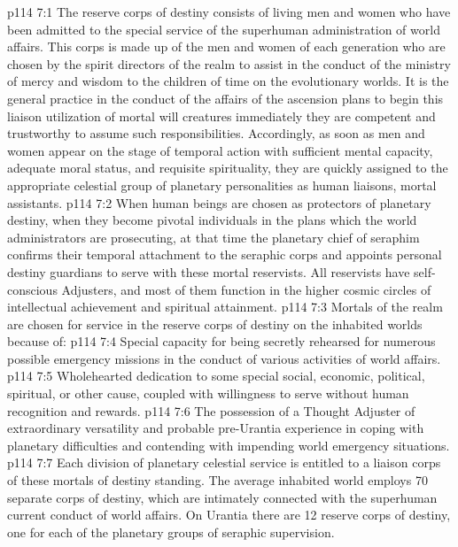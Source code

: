 \vs p114 7:1 The reserve corps of destiny consists of living men and women who have been admitted to the special service of the superhuman administration of world affairs. This corps is made up of the men and women of each generation who are chosen by the spirit directors of the realm to assist in the conduct of the ministry of mercy and wisdom to the children of time on the evolutionary worlds. It is the general practice in the conduct of the affairs of the ascension plans to begin this liaison utilization of mortal will creatures immediately they are competent and trustworthy to assume such responsibilities. Accordingly, as soon as men and women appear on the stage of temporal action with sufficient mental capacity, adequate moral status, and requisite spirituality, they are quickly assigned to the appropriate celestial group of planetary personalities as human liaisons, mortal assistants.
\vs p114 7:2 When human beings are chosen as protectors of planetary destiny, when they become pivotal individuals in the plans which the world administrators are prosecuting, at that time the planetary chief of seraphim confirms their temporal attachment to the seraphic corps and appoints personal destiny guardians to serve with these mortal reservists. All reservists have self\hyp{}conscious Adjusters, and most of them function in the higher cosmic circles of intellectual achievement and spiritual attainment.
\vs p114 7:3 Mortals of the realm are chosen for service in the reserve corps of destiny on the inhabited worlds because of:
\vs p114 7:4 \bibnobreakspace Special capacity for being secretly rehearsed for numerous possible emergency missions in the conduct of various activities of world affairs.
\vs p114 7:5 \bibnobreakspace Wholehearted dedication to some special social, economic, political, spiritual, or other cause, coupled with willingness to serve without human recognition and rewards.
\vs p114 7:6 \bibnobreakspace The possession of a Thought Adjuster of extraordinary versatility and probable pre\hyp{}Urantia experience in coping with planetary difficulties and contending with impending world emergency situations.
\vs p114 7:7 \pc Each division of planetary celestial service is entitled to a liaison corps of these mortals of destiny standing. The average inhabited world employs 70 separate corps of destiny, which are intimately connected with the superhuman current conduct of world affairs. On Urantia there are 12 reserve corps of destiny, one for each of the planetary groups of seraphic supervision.
